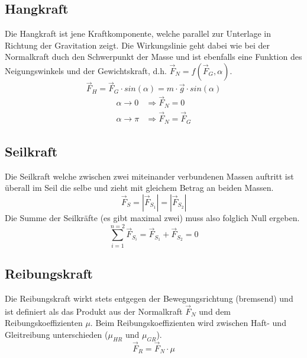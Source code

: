 \subsection{Hangkraft}
Die Hangkraft ist jene Kraftkomponente, welche parallel zur Unterlage in 
Richtung der Gravitation zeigt. Die Wirkungslinie geht dabei wie bei der 
Normalkraft duch den Schwerpunkt der Masse und ist ebenfalls eine Funktion
des Neigungswinkels und der Gewichtskraft, d.h. 
$\vec{F}_N = f(\vec{F}_G, \alpha)$.
\[ \boxed{ \vec{F}_H  
	= \vec{F}_G \cdot sin(\alpha) 
	= m \cdot \vec{g} \cdot sin(\alpha)} 
\]
\[ \begin{array}{ll}
	\alpha \rightarrow 0 & \Rightarrow \vec{F}_N = 0 \\
	\alpha \rightarrow \pi & \Rightarrow \vec{F}_N = \vec{F}_G
\end{array} \]

\subsection{Seilkraft}
Die Seilkraft welche zwischen zwei miteinander verbundenen Massen auftritt
ist überall im Seil die selbe und zieht mit gleichem Betrag an beiden Massen.
\[ \vec{F}_S = |\vec{F}_{S_1}| = |\vec{F}_{S_2}| \]
Die Summe der Seilkräfte (es gibt maximal zwei) muss also folglich Null ergeben.
\[ \sum_{i=1}^{n=2} \vec{F}_{S_i} = \vec{F}_{S_1} + \vec{F}_{S_2} = 0 \]

\subsection{Reibungskraft}
Die Reibungskraft wirkt stets entgegen der Bewegungsrichtung (bremsend) und ist
definiert als das Produkt aus der Normalkraft $\vec{F}_N$ und dem 
Reibungskoeffizienten $\mu$. Beim Reibungskoeffizienten wird  zwischen 
Haft- und Gleitreibung unterschieden ($\mu_{HR}$ und $\mu_{GR}$).
\[ \boxed{\vec{F}_R = \vec{F}_N \cdot \mu} \]

